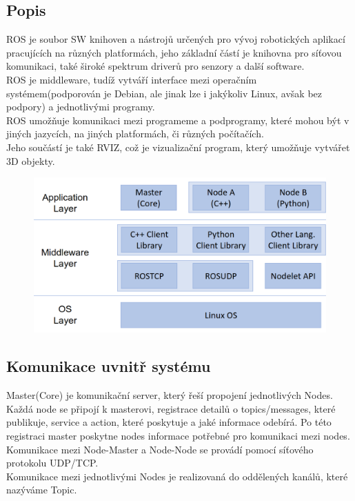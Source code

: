 \subsection{Popis}
ROS je soubor SW knihoven a nástrojů určených pro vývoj robotických aplikací pracujících na různých platformách, jeho základní částí je knihovna pro síťovou komunikaci, také široké spektrum driverů pro senzory a další software. \\
ROS je middleware, tudíž vytváří interface mezi operačním systémem(podporován je Debian, ale jinak lze i jakýkoliv Linux, avšak bez podpory) a jednotlivými programy.\\
ROS umožňuje komunikaci mezi programeme a podprogramy, které mohou být v jiných jazycích, na jiných platformách, či různých počítačích.\\
Jeho součástí je také RVIZ, což je vizualizační program, který umožňuje vytvářet 3D objekty.\\
\begin{figure}[h!]
    \centering
    \includegraphics[scale = 0.2]{img/ROSCommMid.png}
\end{figure}
\subsection{Komunikace uvnitř systému}
Master(Core) je komunikační server, který řeší propojení jednotlivých Nodes. \\
Každá node se připojí k masterovi, registrace detailů o topics/messages, které publikuje, service a action, které poskytuje a jaké informace odebírá. Po této registraci master poskytne nodes informace potřebné pro komunikaci mezi nodes.\\
Komunikace mezi Node-Master a Node-Node se provádí pomocí síťového protokolu UDP/TCP.\\
Komunikace mezi jednotlivými Nodes je realizovaná do oddělených kanálů, které nazýváme Topic.

